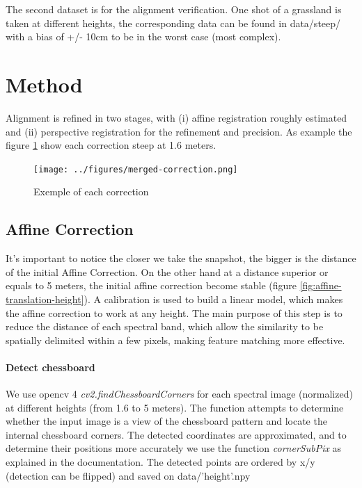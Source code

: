 \documentclass[]{elsarticle}
\begin{document}
	The second dataset is for the alignment verification. One shot of a grassland is taken at different heights, the corresponding data can be found in data/steep/
	with a bias of +/- 10cm to be in the worst case (most complex).
	
	\newpage
	\section{Method}
	
	Alignment is refined in two stages, with
	(i) affine registration roughly estimated
	and (ii) perspective registration for the refinement and precision.
	As example the figure \ref{fig:merged-correction} show each correction steep at 1.6 meters.
	
	\begin{figure}[!htb]
		\centering
		\texttt{[image: ../figures/merged-correction.png]}
		\caption{Exemple of each correction}
		\label{fig:merged-correction}
	\end{figure}
	
	\subsection{Affine Correction}
	
	It's important to notice the closer we take the snapshot, the bigger is the distance of the initial Affine Correction.
	On the other hand at a distance superior or equals to 5 meters, the initial affine correction become stable (figure \ref{fig:affine-translation-height}).
	A calibration is used to build a linear model, which makes the affine correction to work at any height.
	The main purpose of this step is to reduce the distance of each spectral band,
	which allow the similarity to be spatially delimited within a few pixels, making feature matching more effective.
	
	\paragraph{Detect chessboard} We use opencv 4 \textit{cv2.findChessboardCorners} for each spectral image (normalized) at different heights (from 1.6 to 5 meters).
	The function attempts to determine whether the input image is a view of the chessboard pattern and locate the internal chessboard corners.
	The detected coordinates are approximated, and to determine their positions more accurately we use the function \textit{cornerSubPix} as explained in the documentation.
	The detected points are ordered by x/y (detection can be flipped) and saved on data/'height'.npy
	
\end{document}
